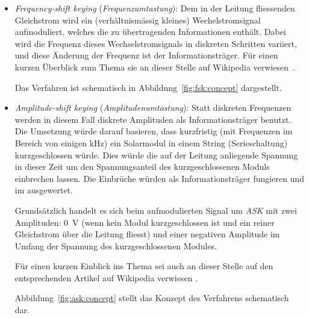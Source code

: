 \begin{itemize}
    \item
        \emph{Frequency-shift      keying}     (\emph{Frequenzumtastung}): Dem
        in      der       Leitung      fliessenden       Gleichstrom      wird
        ein    (verh\"altnism\"assig   kleines)
        Wechelstromsignal   aufmoduliert,  welches   die  zu   \"ubertragenden
        Informationen    enth\"alt. Dabei    wird    die    Frequenz    dieses
        Wechselstromsignals  in  diskreten Schritten  variiert, 
        und diese \"Anderung der Frequenz ist der Informationstr\"ager.  F\"ur
        einen kurzen \"Uberblick zum Thema  sie an dieser Stelle auf Wikipedia
        verwiesen~\cite{ref:fsk:wikipedia}.

        Das  Verfahren  ist   schematisch  in  Abbildung~\ref{fig:fsk:concept}
        dargestellt.
    \item
        \emph{Amplitude-shift    keying}   (\emph{Amplitudenumtastung}): Statt
        diskreten  Frequenzen  werden  in   diesem  Fall  diskrete  Amplituden
        als   Informationstr\"ager  benutzt. Die   Umsetzung  w\"urde   darauf
        basieren,  dass kurzfristig  (mit  Frequenzen im  Bereich von  einigen
        \si{\kilo\hertz})   ein  Solarmodul     in
        einem  String (Serieschaltung)  kurzgeschlossen w\"urde. Dies  w\"urde
        die  auf  der  Leitung  anliegende  Spannung in  dieser  Zeit  um  den
        Spannungsanteil  des kurzgeschlossenen  Moduls einbrechen  lassen. Die
        Einbr\"uche w\"urden als Informationstr\"ager fungieren und im \Master
        ausgewertet.

        Grunds\"atzlich  handelt   es  sich  beim  aufmodulierten   Signal  um
        \emph{ASK}  mit   zwei  Amplituden: \SI{0}{\volt}  (wenn   kein  Modul
        kurzgeschlossen  ist und  ein  reiner Gleichstrom  \"uber die  Leitung
        fliesst)  und einer  negativen Amplitude  im Umfang  der Spannung  des
        kurzgeschlossenen Modules.

        F\"ur   einen  kurzen   Einblick  ins   Thema  sei   auch  an   dieser
        Stelle  auf   den  entsprechenden  Artikel  auf   Wikipedia  verwiesen
        \cite{ref:ask:wikipedia}.

        Abbildung~\ref{fig:ask:concept}  stellt  das  Konzept  des  Verfahrens
        schematisch dar. 
\end{itemize}


